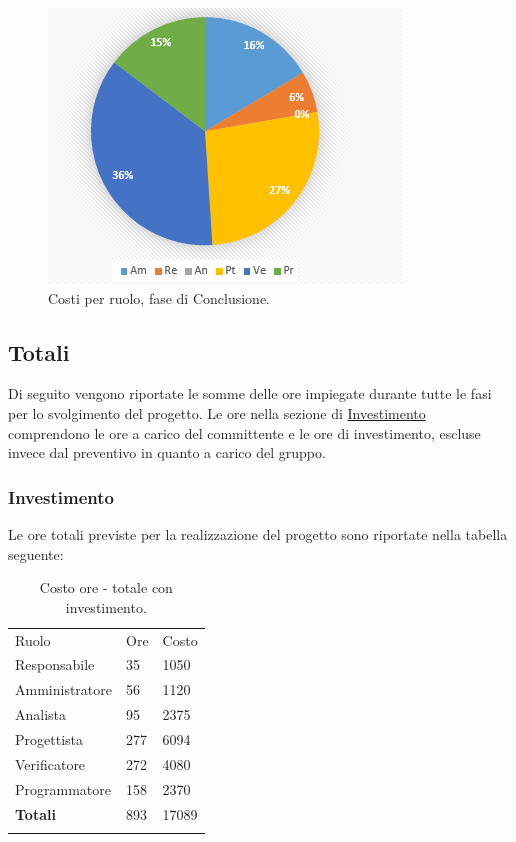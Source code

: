 \documentclass[a4paper]{article}
\begin{document}
			\begin{figure}[H]
				\centering
				\includegraphics[scale=0.7]{pc_costi_conclusione}
				\caption{Costi per ruolo, fase di Conclusione.}
			\end{figure}
			
		\subsection{Totali}
		
			Di seguito vengono riportate le somme delle ore impiegate durante tutte le fasi per lo svolgimento del progetto.
			Le ore nella sezione di \hyperref[SezTotaliInvestimento]{Investimento} comprendono le ore a carico del committente e le 
			ore di investimento, escluse invece dal preventivo in quanto a carico del gruppo. 
			
			\subsubsection{Investimento}
			\label{SezTotaliInvestimento}
				Le ore totali previste per la realizzazione del progetto sono riportate nella tabella seguente:
				
				\begin{table}[H]
					\begin{tabularx}{\textwidth}{Y Y Y}
						Ruolo & Ore & Costo \\
						Responsabile & 35 & 1050 \\
						Amministratore & 56 & 1120 \\
						Analista & 95 & 2375\\
						Progettista & 277 & 6094\\
						Verificatore & 272 & 4080\\
						Programmatore & 158 & 2370 \\
						\textbf{Totali} & 893 & 17089 \\
					\end{tabularx}
				\caption{Costo ore - totale con investimento. } 
				\label{TCTotaleInvestimento}
				\end{table}
				
\end{document}
